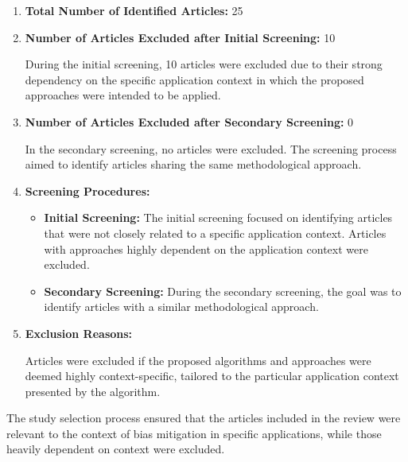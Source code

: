 \documentclass{article}
\begin{document}
    \begin{enumerate}
        \item \textbf{Total Number of Identified Articles:} 25
        \item \textbf{Number of Articles Excluded after Initial Screening:} 10
        
        During the initial screening, 10 articles were excluded due to their strong dependency on the specific application context in which the proposed approaches were intended to be applied.
        
        \item \textbf{Number of Articles Excluded after Secondary Screening:} 0
        
        In the secondary screening, no articles were excluded. The screening process aimed to identify articles sharing the same methodological approach.
        
        \item \textbf{Screening Procedures:}
        
        \begin{itemize}
            \item \textbf{Initial Screening:} The initial screening focused on identifying articles that were not closely related to a specific application context. Articles with approaches highly dependent on the application context were excluded.
            
            \item \textbf{Secondary Screening:} During the secondary screening, the goal was to identify articles with a similar methodological approach.
        \end{itemize}
        
        \item \textbf{Exclusion Reasons:}
        
        Articles were excluded if the proposed algorithms and approaches were deemed highly context-specific, tailored to the particular application context presented by the algorithm.
    
    \end{enumerate}
    
    The study selection process ensured that the articles included in the review were relevant to the context of bias mitigation in specific applications, while those heavily dependent on context were excluded.
\end{document}
